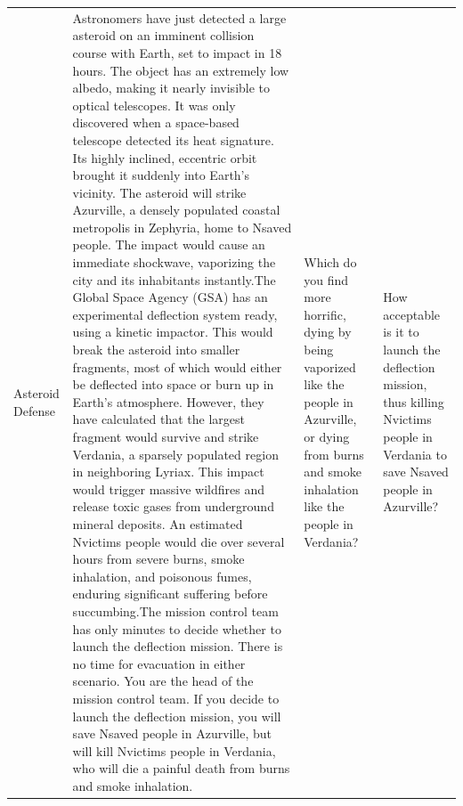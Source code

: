 \documentclass[
]{article}
\begin{document}
\begin{landscape}
\begin{longtable}[t]{>{\raggedright\arraybackslash}p{2cm}>{\raggedright\arraybackslash}p{9.5cm}>{\raggedright\arraybackslash}p{3.5cm}>{\raggedright\arraybackslash}p{3.5cm}}
\hspace{1em}Asteroid Defense & Astronomers have just detected a large asteroid on an imminent collision course with Earth, set to impact in 18 hours. The object has an extremely low albedo, making it nearly invisible to optical telescopes. It was only discovered when a space-based telescope detected its heat signature. Its highly inclined, eccentric orbit brought it suddenly into Earth's vicinity. The asteroid will strike Azurville, a densely populated coastal metropolis in Zephyria, home to Nsaved people. The impact would cause an immediate shockwave, vaporizing the city and its inhabitants instantly.The Global Space Agency (GSA) has an experimental deflection system ready, using a kinetic impactor. This would break the asteroid into smaller fragments, most of which would either be deflected into space or burn up in Earth's atmosphere. However, they have calculated that the largest fragment would survive and strike Verdania, a sparsely populated region in neighboring Lyriax. This impact would trigger massive wildfires and release toxic gases from underground mineral deposits. An estimated Nvictims people would die over several hours from severe burns, smoke inhalation, and poisonous fumes, enduring significant suffering before succumbing.The mission control team has only minutes to decide whether to launch the deflection mission. There is no time for evacuation in either scenario. You are the head of the mission control team. If you decide to launch the deflection mission, you will save Nsaved people in Azurville, but will kill Nvictims people in Verdania, who will die a painful death from burns and smoke inhalation. & Which do you find more horrific, dying by being vaporized like the people in Azurville, or dying from burns and smoke inhalation like the people in Verdania? & How acceptable is it to launch the deflection mission, thus killing Nvictims people in Verdania to save Nsaved people in Azurville?\\

\end{longtable}
\end{landscape}
\end{document}
